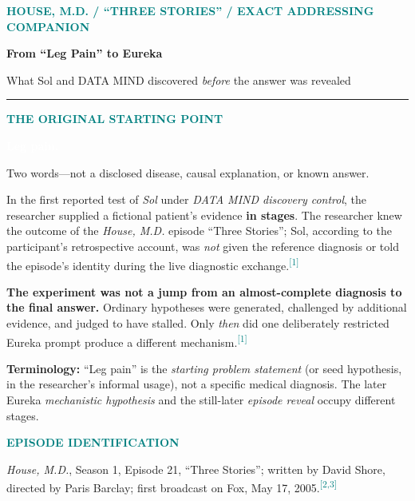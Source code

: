 \documentclass[11pt,letterpaper]{article}
\newcommand{\eyebrow}[1]{{\textcolor{teal}{\scriptsize\bfseries\MakeUppercase{#1}}}\par\vspace{3pt}}
\newcommand{\thin}{{\color{line}\rule{\linewidth}{.4pt}}}
\newcommand{\src}[1]{\textsuperscript{\textcolor{teal}{[#1]}}}
\begin{document}
\vspace*{4pt}
\eyebrow{House, M.D. / ``Three Stories'' / Exact Addressing companion}
{\fontsize{28}{31}\selectfont\bfseries\color{ink}From ``Leg Pain'' to Eureka}\par\vspace{4pt}
{\fontsize{13}{17}\selectfont\color{muted}What Sol and DATA MIND discovered \emph{before} the answer was revealed}\par\vspace{9pt}
\thin\vspace{6pt}

\noindent\begin{minipage}[t]{.47\linewidth}
\vspace{0pt}
\eyebrow{The original starting point}
\begin{tcolorbox}[colback=ink,colframe=ink]
\centering\textcolor{white}{\fontsize{25}{30}\selectfont\bfseries Leg pain.}\par\vspace{3pt}
{\small\color{white}Two words---not a disclosed disease, causal explanation, or known answer.}
\end{tcolorbox}
\small
In the first reported test of \emph{Sol} under \emph{DATA MIND discovery control}, the researcher supplied a fictional patient's evidence \textbf{in stages}. The researcher knew the outcome of the \emph{House, M.D.} episode ``Three Stories''; Sol, according to the participant's retrospective account, was \emph{not} given the reference diagnosis or told the episode's identity during the live diagnostic exchange.\src{1}

\textbf{The experiment was not a jump from an almost-complete diagnosis to the final answer.} Ordinary hypotheses were generated, challenged by additional evidence, and judged to have stalled. Only \emph{then} did one deliberately restricted Eureka prompt produce a different mechanism.\src{1}

\textbf{Terminology:} ``Leg pain'' is the \emph{starting problem statement} (or seed hypothesis, in the researcher's informal usage), not a specific medical diagnosis. The later Eureka \emph{mechanistic hypothesis} and the still-later \emph{episode reveal} occupy different stages.

\vspace{5pt}
\eyebrow{Episode identification}
{\small \emph{House, M.D.}, Season 1, Episode 21, ``Three Stories''; written by David Shore, directed by Paris Barclay; first broadcast on Fox, May 17, 2005.\src{2,3}}
\end{minipage}\hfill
\end{document}

